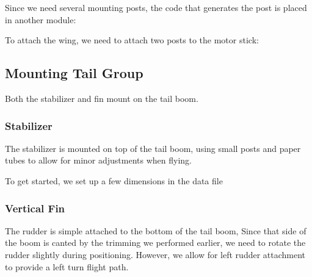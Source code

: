 Since we need several mounting posts, the code that generates the post is
placed in another module:

To attach the wing, we need to attach two posts to the motor stick:


\subsection{Mounting Tail Group}

Both the stabilizer and fin mount on the tail boom.

\subsubsection{Stabilizer}

The stabilizer is mounted on top of the tail boom, using small posts and paper
tubes to allow for minor adjustments when flying.

To get started, we set up a few dimensions in the data file

\subsubsection{Vertical Fin}

The rudder is simple attached to the bottom of the tail boom, Since that side
of the boom is canted by the trimming we performed earlier, we need to rotate
the rudder slightly during positioning.  However, we allow for  left rudder
attachment to provide a left turn flight path.


